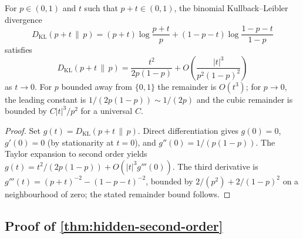 \begin{lemma}
\label{lem:binomial-kl}
For \(p\in(0,1)\) and \(t\) such that \(p+t\in(0,1)\), the binomial Kullback--Leibler
divergence
\[
  D_{\mathrm{KL}}(p+t\,\|\,p)
  =(p+t)\log\frac{p+t}{p}+(1-p-t)\log\frac{1-p-t}{1-p}
\]
satisfies
\[
  D_{\mathrm{KL}}(p+t\,\|\,p)
  =\frac{t^2}{2p(1-p)}+O\!\left(\frac{|t|^3}{p^2(1-p)^2}\right)
\]
as \(t\to 0\). For \(p\) bounded away from \(\{0,1\}\) the remainder is
\(O(t^3)\); for \(p\to 0\), the leading constant is \(1/(2p(1-p))\sim 1/(2p)\)
and the cubic remainder is bounded by \(C|t|^3/p^2\) for a universal \(C\).
\end{lemma}

\begin{proof}
Set \(g(t)=D_{\mathrm{KL}}(p+t\,\|\,p)\). Direct differentiation gives
\(g(0)=0\), \(g'(0)=0\) (by stationarity at \(t=0\)), and
\(g''(0)=1/(p(1-p))\). The Taylor expansion to second order yields
\(g(t)=t^2/(2p(1-p))+O(|t|^3 g'''(0))\). The third derivative is
\(g'''(t)=(p+t)^{-2}-(1-p-t)^{-2}\), bounded by
\(2/(p^2)+2/(1-p)^2\) on a neighbourhood of zero; the stated remainder bound
follows.
\end{proof}

\subsection{Proof of \cref{thm:hidden-second-order}}

